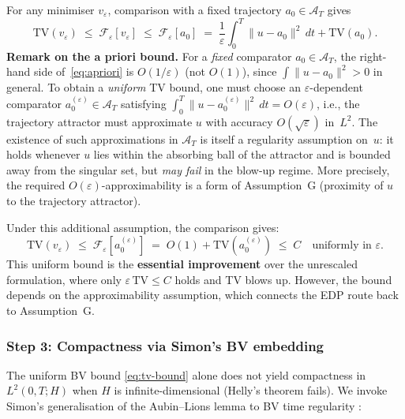 \documentclass[12pt,a4paper]{article}
\theoremstyle{definition}
\theoremstyle{plain}
\theoremstyle{remark}
\begin{document}
For any minimiser $v_\varepsilon$, comparison with a fixed trajectory $a_0 \in \mathcal{A}_T$ gives
\begin{equation}\label{eq:apriori}
  \mathrm{TV}(v_\varepsilon) \;\leq\; \mathcal{F}_\varepsilon[v_\varepsilon] \;\leq\; \mathcal{F}_\varepsilon[a_0] \;=\; \frac{1}{\varepsilon}\int_0^T \|u - a_0\|^2\,dt + \mathrm{TV}(a_0).
\end{equation}
\textbf{Remark on the a priori bound.}\;
For a \emph{fixed} comparator $a_0 \in \mathcal{A}_T$, the right-hand side of~\eqref{eq:apriori} is $O(1/\varepsilon)$ (not $O(1)$), since $\int\|u-a_0\|^2 > 0$ in general.  To obtain a \emph{uniform} TV bound, one must choose an $\varepsilon$-dependent comparator $a_0^{(\varepsilon)} \in \mathcal{A}_T$ satisfying $\int_0^T\|u - a_0^{(\varepsilon)}\|^2\,dt = O(\varepsilon)$, i.e., the trajectory attractor must approximate $u$ with accuracy $O(\sqrt{\varepsilon})$ in~$L^2$.  The existence of such approximations in $\mathcal{A}_T$ is itself a regularity assumption on~$u$: it holds whenever $u$ lies within the absorbing ball of the attractor and is bounded away from the singular set, but \emph{may fail} in the blow-up regime.  More precisely, the required $O(\varepsilon)$-approximability is a form of Assumption~G (proximity of $u$ to the trajectory attractor).

Under this additional assumption, the comparison gives:
\begin{equation}\label{eq:tv-bound}
  \mathrm{TV}(v_\varepsilon) \;\leq\; \mathcal{F}_\varepsilon[a_0^{(\varepsilon)}] \;=\; O(1) + \mathrm{TV}(a_0^{(\varepsilon)}) \;\leq\; C \quad \text{uniformly in } \varepsilon.
\end{equation}
This uniform bound is the \textbf{essential improvement} over the unrescaled formulation, where only $\varepsilon\,\mathrm{TV} \leq C$ holds and TV blows up.  However, the bound depends on the approximability assumption, which connects the EDP route back to Assumption~G.

\subsubsection*{Step 3: Compactness via Simon's BV embedding}

The uniform BV bound \eqref{eq:tv-bound} alone does not yield compactness in $L^2(0,T;H)$ when $H$ is infinite-dimensional (Helly's theorem fails). We invoke Simon's generalisation of the Aubin--Lions lemma to BV time regularity \cite{Simon1987}:
\end{document}
